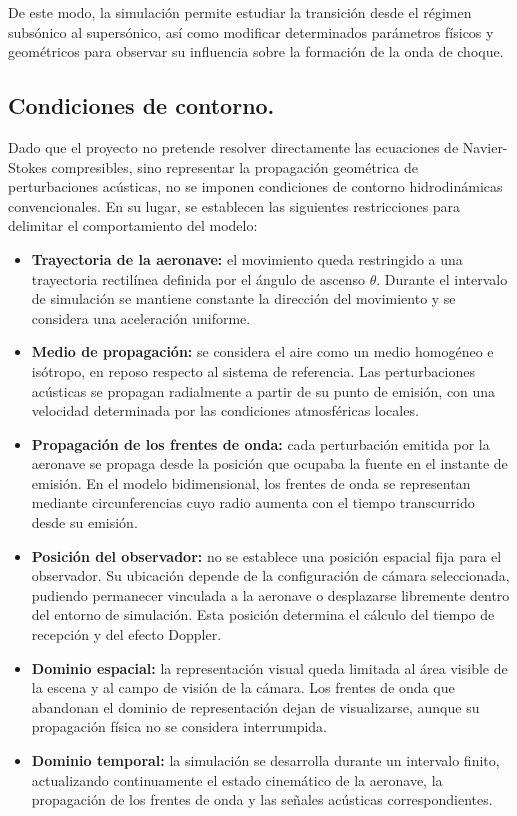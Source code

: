 \documentclass[10.5pt]{article}
\begin{document}
	De este modo, la simulación permite estudiar la transición desde el régimen subsónico al supersónico, así como modificar determinados parámetros físicos y geométricos para observar su influencia sobre la formación de la onda de choque.
	
	\subsection{Condiciones de contorno.}
	
	Dado que el proyecto no pretende resolver directamente las ecuaciones de Navier-Stokes compresibles, sino representar la propagación geométrica de perturbaciones acústicas, no se imponen condiciones de contorno hidrodinámicas convencionales. En su lugar, se establecen las siguientes restricciones para delimitar el comportamiento del modelo:
	
	\begin{itemize}
		
		\item \textbf{Trayectoria de la aeronave:} el movimiento queda restringido a una trayectoria rectilínea definida por el ángulo de ascenso $\theta$. Durante el intervalo de simulación se mantiene constante la dirección del movimiento y se considera una aceleración uniforme.
		
		\item \textbf{Medio de propagación:} se considera el aire como un medio homogéneo e isótropo, en reposo respecto al sistema de referencia. Las perturbaciones acústicas se propagan radialmente a partir de su punto de emisión, con una velocidad determinada por las condiciones atmosféricas locales.
		
		\item \textbf{Propagación de los frentes de onda:} cada perturbación emitida por la aeronave se propaga desde la posición que ocupaba la fuente en el instante de emisión. En el modelo bidimensional, los frentes de onda se representan mediante circunferencias cuyo radio aumenta con el tiempo transcurrido desde su emisión.
		
		\item \textbf{Posición del observador:} no se establece una posición espacial fija para el observador. Su ubicación depende de la configuración de cámara seleccionada, pudiendo permanecer vinculada a la aeronave o desplazarse libremente dentro del entorno de simulación. Esta posición determina el cálculo del tiempo de recepción y del efecto Doppler.
		
		\item \textbf{Dominio espacial:} la representación visual queda limitada al área visible de la escena y al campo de visión de la cámara. Los frentes de onda que abandonan el dominio de representación dejan de visualizarse, aunque su propagación física no se considera interrumpida.
		
		\item \textbf{Dominio temporal:} la simulación se desarrolla durante un intervalo finito, actualizando continuamente el estado cinemático de la aeronave, la propagación de los frentes de onda y las señales acústicas correspondientes.
		
	\end{itemize}
	
\end{document}
